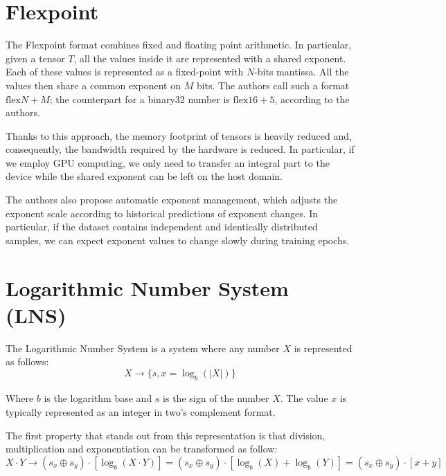 \section{Flexpoint}
The Flexpoint format \cite{koster2017flexpoint,popescu2018flexpoint} combines fixed and floating point arithmetic. In particular, given a tensor $T$, all the values inside it are represented with a shared exponent. Each of these values is represented as a fixed-point with $N$-bits mantissa. All the values then share a common exponent on $M$ bits. The authors call such a format $\text{flex}N+M$; the counterpart for a binary32 number is $\text{flex}16+5$, according to the authors.

Thanks to this approach, the memory footprint of tensors is heavily reduced and, consequently, the bandwidth required by the hardware is reduced. In particular, if we employ GPU computing, we only need to transfer an integral part to the device while the shared exponent can be left on the host domain. 

The authors also propose automatic exponent management, which adjusts the exponent scale according to historical predictions of exponent changes. In particular, if the dataset contains independent and identically distributed samples, we can expect exponent values to change slowly during training epochs.

\section{Logarithmic Number System (LNS)}

The Logarithmic Number System is a system where any number $X$ is represented as follows:
\begin{equation}\label{eqn:logNumSysSet}
    X \xrightarrow[]{}\{ s,x = \log_b(\left| X \right|) \}
\end{equation}

Where $b$ is the logarithm base and $s$ is the sign of the number $X$. The value $x$ is typically represented as an integer in two's complement format.

The first property that stands out from this representation is that division, multiplication and exponentiation can be transformed as follow:
\begin{equation}
    X\cdot Y \xrightarrow[]{} (s_x \oplus s_y)\cdot \left[ \log_b(X \cdot Y) \right] = (s_x \oplus s_y)\cdot \left[ \log_b(X) +  \log_b(Y) \right] = (s_x \oplus s_y)\cdot \left[ x+y \right]
\end{equation}

